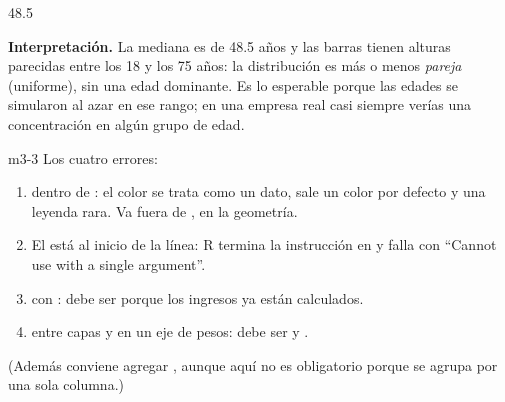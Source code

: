\begin{rsalida}
[1] 48.5
\end{rsalida}

\textbf{Interpretación.} La mediana es de 48.5 años y las barras tienen
alturas parecidas entre los 18 y los 75 años: la distribución es más o
menos \emph{pareja} (uniforme), sin una edad dominante. Es lo esperable
porque las edades se simularon al azar en ese rango; en una empresa real
casi siempre verías una concentración en algún grupo de edad.


\begin{solucion}{m3-3}
Los cuatro errores:
\begin{enumerate}
  \item {} dentro de : el color se
        trata como un dato, sale un color por defecto y una leyenda rara. Va
        fuera de , en la geometría.
  \item El \codigo{+} está al inicio de la línea: R termina la instrucción
        en  y falla con ``Cannot use \codigo{+} with a
        single argument''.
  \item {} con : debe ser 
        porque los ingresos ya están calculados.
  \item \codigo{\%>\%} entre capas y  en un eje de
        pesos: debe ser \codigo{+} y .
\end{enumerate}
(Además conviene agregar , aunque aquí no es
obligatorio porque se agrupa por una sola columna.)
\end{solucion}

